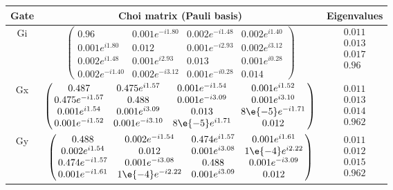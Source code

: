 {\begin{table}[h]
\begin{center}
\begin{tabular}[l]{|c|c|c|}
\hline
Gate & Choi matrix (Pauli basis) & Eigenvalues \\ \hline
Gi & $ \left(\!\!\begin{array}{cccc}
0.96 & 0.001e^{-i1.80} & 0.002e^{-i1.48} & 0.002e^{i1.40} \\ 
0.001e^{i1.80} & 0.012 & 0.001e^{-i2.93} & 0.002e^{i3.12} \\ 
0.002e^{i1.48} & 0.001e^{i2.93} & 0.013 & 0.001e^{i0.28} \\ 
0.002e^{-i1.40} & 0.002e^{-i3.12} & 0.001e^{-i0.28} & 0.014
 \end{array}\!\!\right) $
 & $ \begin{array}{c}
0.011 \\ 
0.013 \\ 
0.017 \\ 
0.96
 \end{array} $
 \\ \hline
Gx & $ \left(\!\!\begin{array}{cccc}
0.487 & 0.475e^{i1.57} & 0.001e^{-i1.54} & 0.001e^{i1.52} \\ 
0.475e^{-i1.57} & 0.488 & 0.001e^{-i3.09} & 0.001e^{i3.10} \\ 
0.001e^{i1.54} & 0.001e^{i3.09} & 0.013 & 8\e{-5}e^{-i1.71} \\ 
0.001e^{-i1.52} & 0.001e^{-i3.10} & 8\e{-5}e^{i1.71} & 0.012
 \end{array}\!\!\right) $
 & $ \begin{array}{c}
0.011 \\ 
0.013 \\ 
0.014 \\ 
0.962
 \end{array} $
 \\ \hline
Gy & $ \left(\!\!\begin{array}{cccc}
0.488 & 0.002e^{-i1.54} & 0.474e^{i1.57} & 0.001e^{i1.61} \\ 
0.002e^{i1.54} & 0.012 & 0.001e^{i3.08} & 1\e{-4}e^{i2.22} \\ 
0.474e^{-i1.57} & 0.001e^{-i3.08} & 0.488 & 0.001e^{-i3.09} \\ 
0.001e^{-i1.61} & 1\e{-4}e^{-i2.22} & 0.001e^{i3.09} & 0.012
 \end{array}\!\!\right) $
 & $ \begin{array}{c}
0.011 \\ 
0.012 \\ 
0.015 \\ 
0.962
 \end{array} $
 \\ \hline
\end{tabular}


\end{center}
\end{table}}
